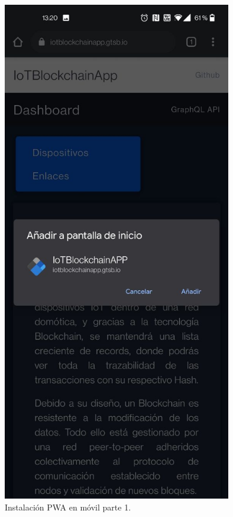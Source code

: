 \begin{figure}[ht!]
  \centering
  \includegraphics[width=10cm]{imagenes/desarrollo/web/pwa/instalacion_pwa_movil}
  \caption{Instalación PWA en móvil parte 1.}
  \label{fig:instalacion-pwa-movil1}
\end{figure}

